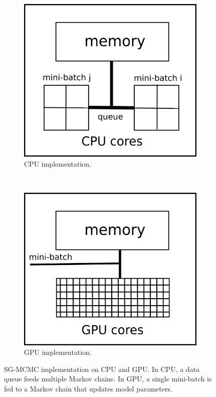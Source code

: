 \documentclass[9pt,lineno]{crone}
\begin{document}
 
\begin{figure}
	\centering
	\begin{subfigure}[b]{0.4\textwidth}
		\includegraphics[width=\textwidth]{figures/cpu_architechture}
		\caption{CPU implementation.}
		\label{fig:cpuarchitechture}
	\end{subfigure}
	~ %
	\begin{subfigure}[b]{0.4\textwidth}
		\includegraphics[width=\textwidth]{figures/gpu_architechture}
		\caption{GPU implementation.}
		\label{fig:gpuarchitechture}
	\end{subfigure}
	\caption{SG-MCMC implementation on CPU and GPU. In CPU, a data queue feeds multiple Markov chains. In GPU, a single mini-batch is fed to a Markov chain that updates model parameters.}\label{fig:sgld_architechture}
\end{figure}
 
\end{document}
